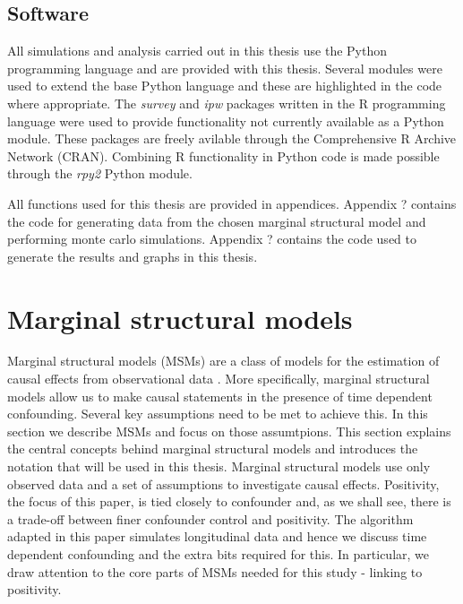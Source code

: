 \documentclass[11pt]{article}
\begin{document}
    \subsection{Software}\label{software}

All simulations and analysis carried out in this thesis use the Python
programming language and are provided with this thesis. Several modules
were used to extend the base Python language and these are highlighted
in the code where appropriate. The \emph{survey} and \emph{ipw} packages
written in the R programming language were used to provide functionality
not currently available as a Python module. These packages are freely
avilable through the Comprehensive R Archive Network (CRAN). Combining R
functionality in Python code is made possible through the \emph{rpy2}
Python module. \linebreak

All functions used for this thesis are provided in appendices. Appendix
? contains the code for generating data from the chosen marginal
structural model and performing monte carlo simulations. Appendix ?
contains the code used to generate the results and graphs in this
thesis.

    \newpage

    \section{Marginal structural models}\label{marginal-structural-models}

Marginal structural models (MSMs) are a class of models for the
estimation of causal effects from observational data \citet{Robins2000}.
More specifically, marginal structural models allow us to make causal
statements in the presence of time dependent confounding. Several key
assumptions need to be met to achieve this. In this section we describe
MSMs and focus on those assumtpions. This section explains the central
concepts behind marginal structural models and introduces the notation
that will be used in this thesis. Marginal structural models use only
observed data and a set of assumptions to investigate causal effects.
Positivity, the focus of this paper, is tied closely to confounder and,
as we shall see, there is a trade-off between finer confounder control
and positivity. The algorithm adapted in this paper simulates
longitudinal data and hence we discuss time dependent confounding and
the extra bits required for this. In particular, we draw attention to
the core parts of MSMs needed for this study - linking to positivity.
\end{document}
